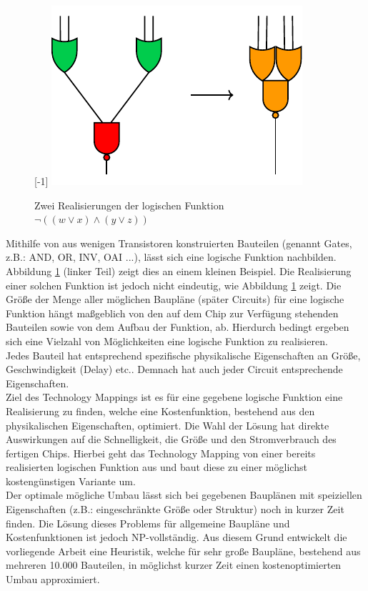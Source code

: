 \documentclass[11pt, a4paper, german]{article}
\newcommand{\TM}{Technology  Mapping }
\begin{document}
\begin{figure}
	\scalebox{1}[-1]{
		\includegraphics[]{pictures/compiled/einfBsp}
	}
		\caption{Zwei Realisierungen der logischen Funktion $\neg((w\lor x) \land (y \lor z))$}
		\label{bild:einfbsp}
\end{figure}
Mithilfe von aus wenigen Transistoren konstruierten Bauteilen (genannt Gates, z.B.: AND, OR, INV, OAI ...), lässt sich eine logische Funktion nachbilden. Abbildung \ref{bild:einfbsp} (linker Teil) zeigt dies an einem kleinen Beispiel.  Die Realisierung einer solchen Funktion ist jedoch nicht eindeutig, wie Abbildung \ref{bild:einfbsp}  zeigt. 
Die Größe der Menge aller möglichen Baupläne (später Circuits) für eine logische Funktion hängt maßgeblich von den auf dem Chip zur Verfügung stehenden Bauteilen sowie von dem Aufbau der Funktion, ab. Hierdurch bedingt ergeben sich eine Vielzahl von  Möglichkeiten eine logische Funktion zu realisieren.\\
 Jedes Bauteil hat entsprechend spezifische physikalische Eigenschaften an Größe, Geschwindigkeit (Delay) etc.. Demnach hat auch jeder Circuit entsprechende Eigenschaften. \\
Ziel des Technology Mappings ist es für eine gegebene logische Funktion eine Realisierung zu finden, welche eine Kostenfunktion, bestehend aus den physikalischen Eigenschaften, optimiert. Die Wahl der Lösung hat direkte Auswirkungen auf die  Schnelligkeit, die Größe und den Stromverbrauch des fertigen Chips. Hierbei geht das \TM von einer bereits realisierten logischen Funktion aus und baut diese zu einer möglichst kostengünstigen Variante um. \\
Der optimale mögliche Umbau lässt sich bei gegebenen Bauplänen mit speiziellen Eigenschaften (z.B.: eingeschr\"ankte Gr\"o{\ss}e oder Struktur) noch in kurzer Zeit finden. Die Lösung dieses Problems für allgemeine Baupläne und Kostenfunktionen ist jedoch NP-vollständig. Aus diesem Grund entwickelt die vorliegende Arbeit eine Heuristik, welche für sehr große Baupläne, bestehend aus mehreren 10.000 Bauteilen, in möglichst kurzer Zeit einen kostenoptimierten Umbau approximiert.\\
\end{document}
